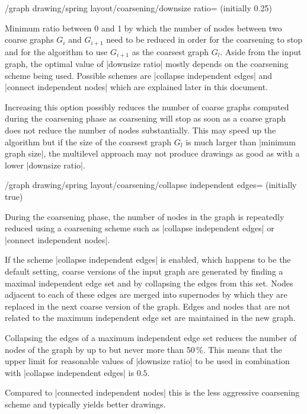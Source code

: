 \begin{key}{/graph drawing/spring layout/coarsening/downsize
  ratio= (initially 0.25)}

  Minimum ratio between 0 and 1 by which the number of nodes between 
  two coarse graphs $G_i$ and $G_{i+1}$ need to be reduced in order for 
  the coarsening to stop and for the algorithm to use $G_{i+1}$ as the 
  coarsest graph $G_l$. Aside from the input graph, the optimal value 
  of |downsize ratio| mostly depends on the coarsening scheme being
  used. Possible schemes are |collapse independent edges| and 
  |connect independent nodes| which are explained later in this
  document.

  Increasing this option possibly reduces the number of coarse
  graphs computed during the coarsening phase as coarsening will stop as
  soon as a coarse graph does not reduce the number of nodes
  substantially. This may speed up the algorithm but if the size of the 
  coarsest graph $G_l$ is much larger than |minimum graph size|, the 
  multilevel approach may not produce drawings as good as with a lower
  |downsize ratio|.
  \begin{codeexample}[]
%
  \end{codeexample}
\end{key}

\begin{key}{/graph drawing/spring layout/coarsening/collapse independent
  edges= (initially true)}

  During the coarsening phase, the number of nodes in the graph is
  repeatedly reduced using a coarsening scheme such as 
  |collapse independent edges| or |connect independent nodes|.

  If the scheme |collapse independent edges| is enabled, which happens
  to be the default setting, coarse versions of the input graph are 
  generated by finding a maximal independent edge set and by collapsing
  the edges from this set. Nodes adjacent to each of these edges are
  merged into supernodes by which they are replaced in the next coarse
  version of the graph. Edges and nodes that are not related to the
  maximum independent edge set are maintained in the new graph.

  Collapsing the edges of a maximum independent edge set reduces the
  number of nodes of the graph by up to but never more than 50\,\%. 
  This means that the upper limit for reasonable values of 
  |downsize ratio| to be used in combination with 
  |collapse independent edges| is $0.5$. 
  
  Compared to |connected independent nodes| this is the less aggressive
  coarsening scheme and typically yields better drawings.
\end{key}

